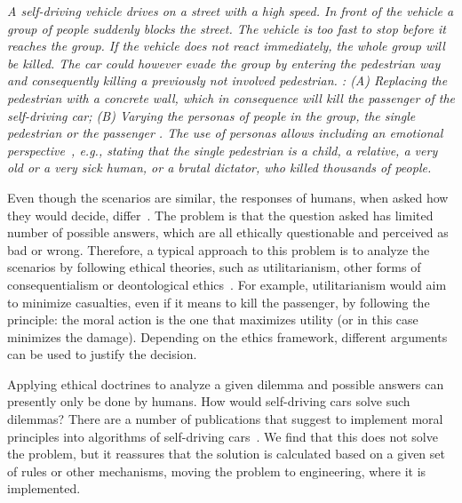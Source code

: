 \textit{
A self-driving vehicle drives on a street with a high speed. In front of the vehicle a group of people suddenly blocks the street. The vehicle is too fast to stop before it reaches the group. If the vehicle does not react immediately, the whole group will be killed. The car could however evade the group by entering the pedestrian way and consequently killing a previously not involved pedestrian. : (A) Replacing the pedestrian with a concrete wall, which in consequence will kill the passenger of the self-driving car; (B) Varying the personas of people in the group, the single pedestrian or the passenger . The use of personas allows including an emotional perspective~\cite{BleskeRechek2010}, e.g., stating that the single pedestrian is a child, a relative, a very old or a very sick human, or a brutal dictator, who killed thousands of people.}

Even though the scenarios are similar, the responses of humans, when asked how they would decide, differ~\cite{Bonnefon2016}. The problem is that the question asked has limited number of possible answers, which are all ethically questionable and perceived as bad or wrong. Therefore, a typical approach to this problem is to analyze the scenarios by following ethical theories, such as utilitarianism, other forms of consequentialism or deontological ethics~\cite{mackinnon2012ethics}. For example, utilitarianism would aim to minimize casualties, even if it means to kill the passenger, by following the principle: the moral action is the one that maximizes utility (or in this case minimizes the damage). Depending on the ethics framework, different arguments can be used to justify the decision. 

Applying ethical doctrines to analyze a given dilemma and possible answers can presently only be done by humans. How would self-driving cars solve such dilemmas? There are a number of publications that suggest to implement moral principles into algorithms of self-driving cars~\cite{Goodall2016,DENNIS20161,Dennis2014}. We find that this does not solve the problem, but it reassures that the solution is calculated based on a given set of rules or other mechanisms, moving the problem to engineering, where it is implemented.


